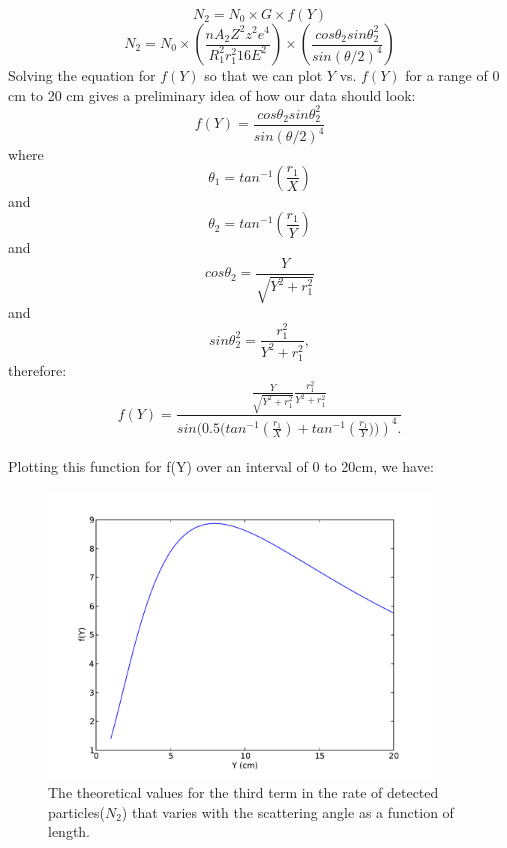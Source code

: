 \begin{equation} N_2= N_0\times G\times f(Y) \end{equation}
\begin{equation} N_2=N_0\times \left( \frac{nA_2Z^2z^2e^4}{R_1^2r_1^2 16 E^2}\right)\times \left(\frac{cos\theta_2 sin\theta_2^2}{sin(\theta/2)^4}\right) \end {equation}
Solving the equation for $f(Y)$ so that we can plot $Y$ vs. $f(Y)$ for a range of 0 cm to 20 cm gives a preliminary idea of how our data should look:
\begin{equation} f(Y)=\frac{cos\theta_2 sin\theta_2^2}{sin(\theta/2)^4} \end{equation} where
\begin{equation} \theta_1=tan^{-1}\left(\frac{r_1}{X}\right)\end{equation} and
\begin{equation} \theta_2=tan^{-1}\left(\frac{r_1}{Y}\right)\end{equation} and
\begin{equation} cos\theta_2=\frac{Y}{\sqrt{Y^2+r_1^2}} \end{equation} and
\begin{equation} sin\theta_2^2=\frac{r_1^2}{Y^2+r_1^2}, \end{equation} therefore:
\begin{equation} f(Y)= \frac{\frac{Y}{\sqrt{Y^2+r_1^2}} \frac{r_1^2}{Y^2+r_1^2}}{sin(0.5(tan^{-1}\left(\frac{r_1}{X}\right) + tan^{-1}\left(\frac{r_1}{Y}))\right)^4.} \end{equation}\\
Plotting this function for f(Y) over an interval of 0 to 20cm, we have:

\begin{figure}[h!]
\begin{center}
\includegraphics[width=4in]{preliminary_plot.pdf}
\caption{The theoretical values for the third term in the rate of detected particles($N_2$) that varies with the scattering angle as a function of length.}
\end{center}
\end{figure}

